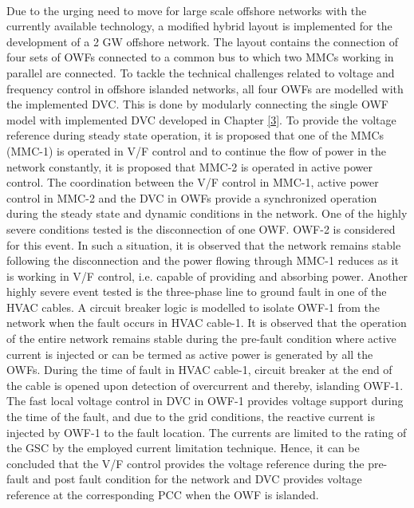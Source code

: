 \paragraph{} Due to the urging need to move for large scale offshore networks with the currently available technology, a modified hybrid layout is implemented for the development of a 2 GW offshore network. The layout contains the connection of four sets of \gls{OWF}s connected to a common bus to which two \gls{MMC}s working in parallel are connected. To tackle the technical challenges related to voltage and frequency control in offshore islanded networks, all four \gls{OWF}s are modelled with the implemented \gls{DVC}. This is done by modularly connecting the single \gls{OWF} model with implemented \gls{DVC} developed in Chapter \ref{3}. To provide the voltage reference during steady state operation, it is proposed that one of the \gls{MMC}s (\gls{MMC}-1) is operated in V/F control and to continue the flow of power in the network constantly, it is proposed that \gls{MMC}-2 is operated in active power control. %
The coordination between the V/F control in \gls{MMC}-1, active power control in \gls{MMC}-2 and the \gls{DVC} in \gls{OWF}s provide a synchronized operation during the steady state and dynamic conditions in the network. One of the highly severe conditions tested is the disconnection of one \gls{OWF}. \gls{OWF}-2 is considered for this event. In such a situation, it is observed that the network remains stable following the disconnection and the power flowing through \gls{MMC}-1 reduces as it is working in V/F control, i.e. capable of providing and absorbing power. Another highly severe event tested is the three-phase line to ground fault in one of the \gls{HVAC} cables. A circuit breaker logic is modelled to isolate \gls{OWF}-1 from the network when the fault occurs in \gls{HVAC} cable-1. It is observed that the operation of the entire network remains stable during the pre-fault condition where active current is injected or can be termed as active power is generated by all the \gls{OWF}s. During the time of fault in \gls{HVAC} cable-1, circuit breaker at the end of the cable is opened upon detection of overcurrent and thereby, islanding \gls{OWF}-1. The fast local voltage control in \gls{DVC} in \gls{OWF}-1 provides voltage support during the time of the fault, and due to the grid conditions, the reactive current is injected by \gls{OWF}-1 to the fault location. The currents are limited to the rating of the \gls{GSC} by the employed current limitation technique. Hence, it can be concluded that the V/F control provides the voltage reference during the pre-fault and post fault condition for the network and \gls{DVC} provides voltage reference at the corresponding \gls{PCC} when the \gls{OWF} is islanded.

